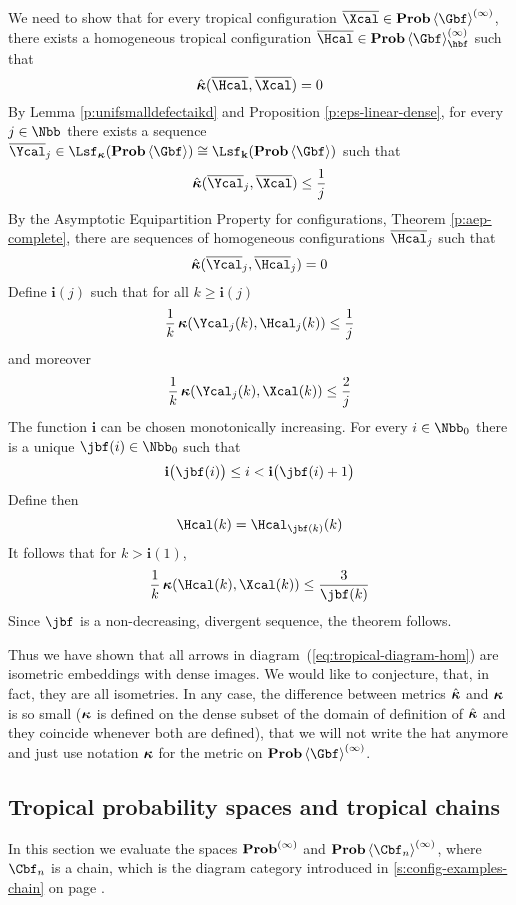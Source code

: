   \begin{Proof}
  	 We need to show that for every tropical configuration $\bar\Xcal \in \prob\<\Gbf>^{(\infty)}$, there 
  	exists a homogeneous tropical configuration $\bar \Hcal \in \prob\<\Gbf>_\hbf^{(\infty)}$ such that
  	\[
  	\hat{\aikd}(\bar\Hcal, \bar\Xcal) = 0
  	\]
  By Lemma \ref{p:unifsmalldefectaikd} and Proposition \ref{p:eps-linear-dense}, for every $j \in \Nbb$ there exists a sequence $\bar\Ycal_j \in \lin_{\aikd}(\prob\<\Gbf>) \cong \lin_{\ikd}(\prob\<\Gbf>)$	such that 
  \[
  \hat{\aikd}(\bar{\Ycal}_j, \bar\Xcal) \leq \frac{1}{j}
  \]
  By the Asymptotic Equipartition Property for configurations, Theorem \ref{p:aep-complete},
  there are sequences of homogeneous configurations $\bar\Hcal_j$ such that 
  \[
  \hat{\aikd}(\bar\Ycal_j, \bar\Hcal_j) = 0
  \]
  Define $\mathbf{i}(j)$ such that for all $k \geq \mathbf{i}(j)$
  \[
  \frac{1}{k} \aikd(\Ycal_j(k), \Hcal_j(k)) \leq \frac{1}{j}
  \]
  and  moreover
  \[
  \frac{1}{k} \aikd(\Ycal_j(k), \Xcal(k)) \leq \frac{2}{j}
  \]
  The function $\mathbf{i}$ can be chosen monotonically increasing. 
  For every $i \in \Nbb_0$ there is a unique $\jbf(i) \in \Nbb_0$ such that 
  \[
  \mathbf{i}\big(\jbf(i)\big) \leq i < \mathbf{i}\big(\jbf(i)+1\big)
  \]
  Define then
  \[
  \Hcal(k) = \Hcal_{\jbf(k)}(k)
  \]
  It follows that for $k > \mathbf{i}(1)$,
  \[
  \frac{1}{k}\aikd(\Hcal(k), \Xcal(k)) \leq \frac{3}{\jbf(k)}
  \]
  Since $\jbf$ is a non-decreasing, divergent sequence, the theorem follows.
  \end{Proof}  

  \bigskip
  
  Thus we have shown that all arrows in
  diagram~(\ref{eq:tropical-diagram-hom}) are isometric embeddings
  with dense images.  We would like to conjecture, that, in fact, they
  are all isometries.  In any case, the difference between metrics
  $\hat{\operatorname{{\bm\kappa}}}$ and $\operatorname{{\bm\kappa}}$ is so small ($\operatorname{{\bm\kappa}}$ is defined on the dense
  subset of the domain of definition of $\hat{\operatorname{{\bm\kappa}}}$ and they coincide
  whenever both are defined), that we will not write the hat anymore
  and just use notation $\operatorname{{\bm\kappa}}$ for the metric on
  $\prob\<\Gbf>^{(\infty)}$.
  


\subsection{Tropical probability spaces and tropical chains}
\label{se:tropprobtropchains}
  In this section we evaluate the spaces $\operatorname{\mathbf{Prob}}^{(\infty)}$ and
  $\prob\<\Cbf_{n}>^{(\infty)}$, where $\Cbf_n$ is a chain, which is
  the diagram category introduced in \ref{s:config-examples-chain} on
  page \pageref{s:config-examples-chain}.

